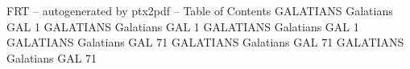 \id FRT -- autogenerated by ptx2pdf --
\is Table of Contents
\tr {} GALATIANS Galatians GAL 1
\tr {} GALATIANS Galatians GAL 1
\tr {} GALATIANS Galatians GAL 1
\tr {} GALATIANS Galatians GAL 71
\tr {} GALATIANS Galatians GAL 71
\tr {} GALATIANS Galatians GAL 71
